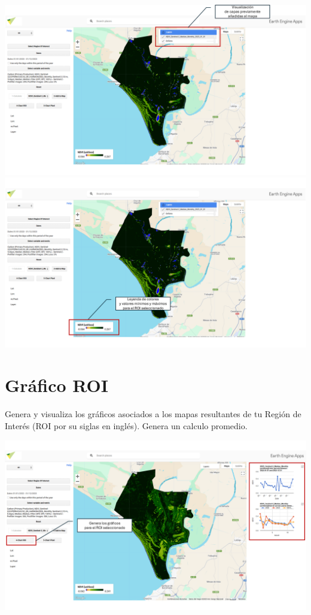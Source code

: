 \documentclass[
]{book}
\begin{document}
\includegraphics{assets/layers_es2.png}
\includegraphics{assets/leyenda_es.png}

\section{\texorpdfstring{\textbf{Gráfico ROI}}{Gráfico ROI}}\label{gruxe1fico-roi-1}

Genera y visualiza los gráficos asociados a los mapas resultantes de tu Región de Interés (ROI por su siglas en inglés). Genera un calculo promedio.

\includegraphics{assets/graphs_es.png}
\end{document}
